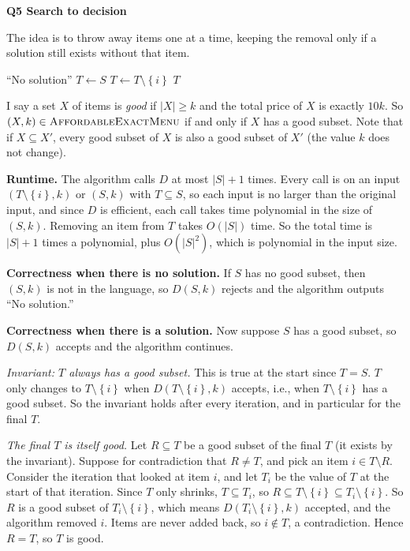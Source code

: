 \documentclass[11pt]{article}
\newcommand{\set}[1]{\left\{#1\right\}}
\newcommand{\abs}[1]{\left|#1\right|}
\newcommand{\cproblem}[1]{\textsc{#1}}
\newcommand{\AEM}{\cproblem{AffordableExactMenu}}
\newcommand{\qpage}[1]{\clearpage\noindent\textbf{\large #1}\par\medskip}
\begin{document}
\qpage{Q5 Search to decision}

The idea is to throw away items one at a time, keeping the removal only if a solution still exists without that item.

\begin{algorithmic}[1]
     \Return ``No solution''
    \EndIf
    \State $T \gets S$
      \If{$D(T \setminus \set{i}, k)$ accepts}
        \State $T \gets T \setminus \set{i}$
      \EndIf
    \EndFor
    \State \Return $T$
  \EndFunction
\end{algorithmic}

I say a set $X$ of items is \emph{good} if $\abs{X} \geq k$ and the total price of $X$ is exactly $10k$.
So $(X, k) \in \AEM$ if and only if $X$ has a good subset.
Note that if $X \subseteq X'$, every good subset of $X$ is also a good subset of $X'$ (the value $k$ does not change).

\textbf{Runtime.}
The algorithm calls $D$ at most $\abs{S} + 1$ times.
Every call is on an input $(T \setminus \set{i}, k)$ or $(S, k)$ with $T \subseteq S$, so each input is no larger than the original input, and since $D$ is efficient, each call takes time polynomial in the size of $(S, k)$.
Removing an item from $T$ takes $O(\abs{S})$ time.
So the total time is $\abs{S} + 1$ times a polynomial, plus $O(\abs{S}^2)$, which is polynomial in the input size.

\textbf{Correctness when there is no solution.}
If $S$ has no good subset, then $(S, k)$ is not in the language, so $D(S, k)$ rejects and the algorithm outputs ``No solution.''

\textbf{Correctness when there is a solution.}
Now suppose $S$ has a good subset, so $D(S, k)$ accepts and the algorithm continues.

\emph{Invariant: $T$ always has a good subset.}
This is true at the start since $T = S$.
$T$ only changes to $T \setminus \set{i}$ when $D(T \setminus \set{i}, k)$ accepts, i.e., when $T \setminus \set{i}$ has a good subset.
So the invariant holds after every iteration, and in particular for the final $T$.

\emph{The final $T$ is itself good.}
Let $R \subseteq T$ be a good subset of the final $T$ (it exists by the invariant).
Suppose for contradiction that $R \neq T$, and pick an item $i \in T \setminus R$.
Consider the iteration that looked at item $i$, and let $T_i$ be the value of $T$ at the start of that iteration.
Since $T$ only shrinks, $T \subseteq T_i$, so $R \subseteq T \setminus \set{i} \subseteq T_i \setminus \set{i}$.
So $R$ is a good subset of $T_i \setminus \set{i}$, which means $D(T_i \setminus \set{i}, k)$ accepted, and the algorithm removed $i$.
Items are never added back, so $i \notin T$, a contradiction.
Hence $R = T$, so $T$ is good.
\end{document}
